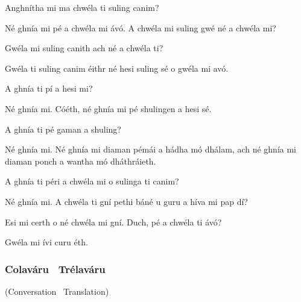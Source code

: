 \begingroup
\fontsize{10pt}{12pt}\selectfont
\begin{leftbubbles}Anghn\'{i}tha mi ma chw\'{e}la ti suling canim?\end{leftbubbles}
\begin{rightbubbles}N\'{e} ghn\'{i}a mi p\'{e} a chw\'{e}la mi \'{a}v\'{o}. A chw\'{e}la mi suling gw\'{e} n\'{e} a chw\'{e}la mi?\end{rightbubbles}
\begin{leftbubbles}Gw\'{e}la mi suling canith ach n\'{e} a chw\'{e}la ti?\end{leftbubbles}
\begin{rightbubbles}Gw\'{e}la ti suling canim \'{e}ithr n\'{e} hesi suling s\'{e} o gw\'{e}la mi av\'{o}.\end{rightbubbles}
\begin{leftbubbles}A ghn\'{i}a ti p\'{i} a hesi mi?\end{leftbubbles}
\begin{rightbubbles}N\'{e} ghn\'{i}a mi. C\'{o}\'{e}th, n\'{e} ghn\'{i}a mi p\'{e} shulingen a hesi s\'{e}.\end{rightbubbles}
\begin{leftbubbles}A ghn\'{i}a ti p\'{e} gaman a shuling?\end{leftbubbles}
\begin{rightbubbles}N\'{e} ghn\'{i}a mi. N\'{e} ghn\'{i}a mi diaman p\'{e}m\'{a}i a h\'{a}dha m\'{o} dh\'{a}lam, ach n\'{e} ghn\'{i}a mi diaman ponch a wantha m\'{o} dh\'{a}thr\'{a}ieth.\end{rightbubbles}
\begin{leftbubbles}A ghn\'{i}a ti p\'{e}ri a chw\'{e}la mi o sulinga ti canim?\end{leftbubbles}
\begin{rightbubbles}N\'{e} ghn\'{i}a mi. A chw\'{e}la ti gn\'{i} pethi b\'{a}n\'{e} u guru a h\'{i}va mi pap d\'{i}?\end{rightbubbles}
\begin{leftbubbles}Esi mi certh o n\'{e} chw\'{e}la mi gn\'{i}. Duch, p\'{e} a chw\'{e}la ti \'{a}v\'{o}?\end{leftbubbles}
\begin{rightbubbles}Gw\'{e}la mi \'{i}vi curu \'{e}th.\end{rightbubbles}
\endgroup

\newpage
\subsubsection{Colav\'{a}ru \textendash\ Tr\'{e}lav\'{a}ru}
(Conversation \textendash\ Translation)

